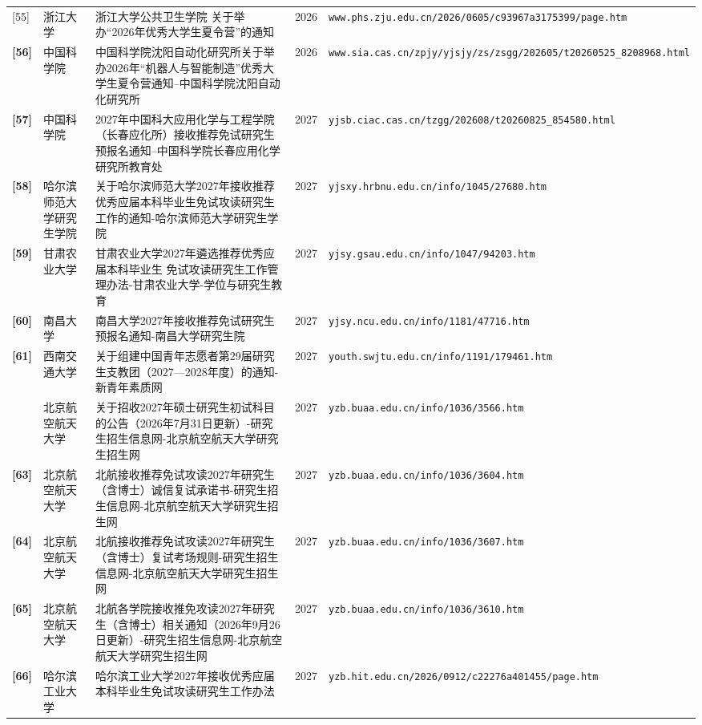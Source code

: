 {\begin{longtable}{@{}p{1.15cm}p{2.9cm}p{6.3cm}p{0.85cm}p{5.0cm}@{}}
[55] & 浙江大学 & 浙江大学公共卫生学院 关于举办“2026年优秀大学生夏令营”的通知 & 2026 & \texttt{www.phs.zju.edu.cn/2026/0605/c93967a3175399/page.htm} \\
\textbf{[56]} & 中国科学院 & 中国科学院沈阳自动化研究所关于举办2026年“机器人与智能制造”优秀大学生夏令营通知--中国科学院沈阳自动化研究所 & 2026 & \texttt{www.sia.cas.cn/zpjy/yjsjy/zs/zsgg/202605/t20260525\_8208968.html} \\
\textbf{[57]} & 中国科学院 & 2027年中国科大应用化学与工程学院（长春应化所）接收推荐免试研究生预报名通知--中国科学院长春应用化学研究所教育处 & 2027 & \texttt{yjsb.ciac.cas.cn/tzgg/202608/t20260825\_854580.html} \\
\textbf{[58]} & 哈尔滨师范大学研究生学院 & 关于哈尔滨师范大学2027年接收推荐优秀应届本科毕业生免试攻读研究生工作的通知-哈尔滨师范大学研究生学院 & 2027 & \texttt{yjsxy.hrbnu.edu.cn/info/1045/27680.htm} \\
\textbf{[59]} & 甘肃农业大学 & 甘肃农业大学2027年遴选推荐优秀应届本科毕业生 免试攻读研究生工作管理办法-甘肃农业大学-学位与研究生教育 & 2027 & \texttt{yjsy.gsau.edu.cn/info/1047/94203.htm} \\
\textbf{[60]} & 南昌大学 & 南昌大学2027年接收推荐免试研究生预报名通知-南昌大学研究生院 & 2027 & \texttt{yjsy.ncu.edu.cn/info/1181/47716.htm} \\
\textbf{[61]} & 西南交通大学 & 关于组建中国青年志愿者第29届研究生支教团（2027—2028年度）的通知-新青年素质网 & 2027 & \texttt{youth.swjtu.edu.cn/info/1191/179461.htm} \\
[62] & 北京航空航天大学 & 关于招收2027年硕士研究生初试科目的公告（2026年7月31日更新）-研究生招生信息网-北京航空航天大学研究生招生网 & 2027 & \texttt{yzb.buaa.edu.cn/info/1036/3566.htm} \\
\textbf{[63]} & 北京航空航天大学 & 北航接收推荐免试攻读2027年研究生（含博士）诚信复试承诺书-研究生招生信息网-北京航空航天大学研究生招生网 & 2027 & \texttt{yzb.buaa.edu.cn/info/1036/3604.htm} \\
\textbf{[64]} & 北京航空航天大学 & 北航接收推荐免试攻读2027年研究生（含博士）复试考场规则-研究生招生信息网-北京航空航天大学研究生招生网 & 2027 & \texttt{yzb.buaa.edu.cn/info/1036/3607.htm} \\
\textbf{[65]} & 北京航空航天大学 & 北航各学院接收推免攻读2027年研究生（含博士）相关通知（2026年9月26日更新）-研究生招生信息网-北京航空航天大学研究生招生网 & 2027 & \texttt{yzb.buaa.edu.cn/info/1036/3610.htm} \\
\textbf{[66]} & 哈尔滨工业大学 & 哈尔滨工业大学2027年接收优秀应届本科毕业生免试攻读研究生工作办法 & 2027 & \texttt{yzb.hit.edu.cn/2026/0912/c22276a401455/page.htm} \\

\end{longtable}}

